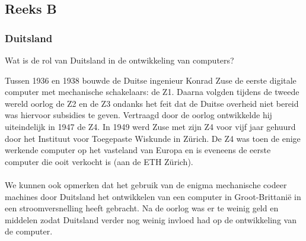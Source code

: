 \documentclass[../main.tex]{subfiles}
\begin{document}
\subsection{Reeks B}
\subsubsection{Duitsland}
\begin{question}
Wat is de rol van Duitsland in de ontwikkeling van computers?
\end{question}
\begin{solution}
Tussen 1936 en 1938 bouwde de Duitse ingenieur Konrad Zuse de eerste digitale computer met mechanische schakelaars: de Z1.
Daarna volgden tijdens de tweede wereld oorlog de Z2 en de Z3 ondanks het feit dat de Duitse overheid niet bereid was hiervoor subsidies te geven.
Vertraagd door de oorlog ontwikkelde hij uiteindelijk in 1947 de Z4. In 1949 werd Zuse met zijn Z4 voor vijf jaar gehuurd door het Instituut voor Toegepaste Wiskunde in Z\"urich.
De Z4 was toen de enige werkende computer op het vasteland van Europa en is eveneens de eerste computer die ooit verkocht is (aan de ETH Z\"urich).
\\\\
We kunnen ook opmerken dat het gebruik van de enigma mechanische codeer machines door Duitsland het ontwikkelen van een computer in Groot-Brittani\"e in een stroomversnelling heeft gebracht. Na de oorlog was er te weinig geld en middelen zodat Duitsland verder nog weinig invloed had op de ontwikkeling van de computer.
\end{solution}
\end{document}
